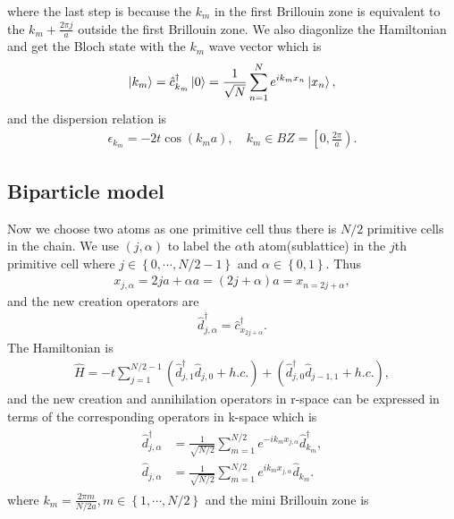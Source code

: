 \documentclass[10pt, oneside]{article}
\newcommand{\p}[1]{\left(#1\right)}
\newcommand{\br}[1]{\left\{#1\right\}}
\begin{document}
where the last step is because the \(k_{m}\) in the first Brillouin zone is  equivalent to the \(k_m + \frac{2 \pi j}{a}\) outside the first Brillouin zone. We also diagonlize the Hamiltonian and get the Bloch state with the \(k_{m}\) wave vector which is 
\begin{align}
    \ket{k_{m}} = \hat{c}^{\dagger}_{k_{m}} \ket{0} = \frac{1}{\sqrt{N}} \sum_{n = 1}^{N} e^{i k_{m} x_{n}} \ket{x_{n}},
\end{align} 
and the dispersion relation is 
\begin{align}
    \epsilon_{k_{m}} = -2t \cos \p{k_{m} a}, \quad k_{m} \in BZ = \left[0 , \frac{2\pi}{a} \right).
\end{align}


\subsection{Biparticle model}
Now we choose two atoms as one primitive cell thus there is \(N/2\) primitive cells in the chain. We use \(\p{j, \alpha}\) to label the \(\alpha\)th atom(sublattice) in the \(j\)th primitive cell where  \(j \in \br{0,\cdots, N/2 - 1} \) and \(\alpha \in \br{0, 1}\). Thus
\begin{align}
	x_{j, \alpha} = 2 j a + \alpha a = \p{2j + \alpha}a = x_{n = 2j + \alpha},
\end{align}
and the new creation operators are
\begin{align}
	\hat{d}^{\dagger}_{j, \alpha} = \hat{c}^{\dagger}_{x_{2j + \alpha}}.
\end{align}
The Hamiltonian is 
\begin{align}
	\hat{H} = -t \sum_{j = 1}^{N/2 - 1} \p{\hat{d}^{\dagger}_{j,1}\hat{d}_{j,0} + h.c.} + \p{\hat{d}^{\dagger}_{j,0}\hat{d}_{j - 1,1} + h.c.},
\end{align}
and the new creation and annihilation operators in r-space can be expressed in terms of the corresponding operators in k-space which is
\begin{align}
	\begin{split}
		\hat{d}^{\dagger}_{j, \alpha} &= \frac{1}{\sqrt{N/2}} \sum_{m = 1}^{N/2} e^{-i k_{m} x_{j, \alpha}} \hat{d}^{\dagger}_{k_{m}},\\
	\hat{d}_{j, \alpha} &= \frac{1}{\sqrt{N/2}} \sum_{m = 1}^{N/2} e^{i k_{m} x_{j, \alpha}} \hat{d}_{k_{m}}.
	\end{split}
\end{align}
where \(k_{m} = \frac{2\pi m}{N/2 a} , m \in \br{1, \cdots, N/2}\) and the mini Brillouin zone is 
\end{document}
